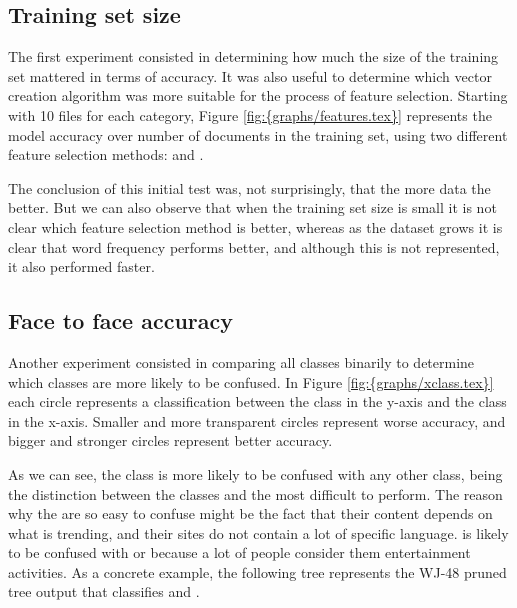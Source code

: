 \subsection{Training set size}
The first experiment consisted in determining how much the size of the training set mattered in terms of accuracy. It was also useful to determine which vector creation algorithm was
more suitable for the process of feature selection. Starting with 10 files for each category, Figure \ref{fig:{graphs/features.tex}} represents the model accuracy over number of documents 
in the training set, using two different feature selection methods:  and .

 
The conclusion of this initial test was, not surprisingly, that the more data the better. But we can also observe that when the training set size is small it is not clear which feature selection 
method is better, whereas as the dataset grows it is clear that word frequency performs better, and although this is not represented, it also performed faster.

\subsection{Face to face accuracy}
Another experiment consisted in comparing all classes binarily to determine which classes are more likely to be confused. In Figure \ref{fig:{graphs/xclass.tex}} each circle represents a classification 
between the class in the y-axis and the class in the x-axis. Smaller and more transparent circles represent worse accuracy, and bigger and stronger circles represent better accuracy. 


As we can see, the class  is more likely to be confused with any other class, being the distinction between the classes  and  the most
difficult to perform. The reason why the  are so easy to confuse might be the fact that their content depends on what is trending, and their sites do not contain a lot of specific language.
 is likely to be confused with  or  because a lot of people consider them entertainment activities. 
As a concrete example, the following tree represents the WJ-48 pruned tree output that classifies  and .

